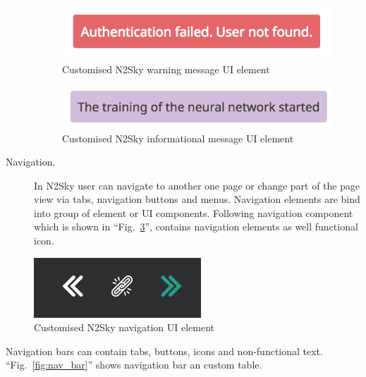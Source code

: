 \begin{description}
\begin{figure}[htbp]
\begin{center}
  \includegraphics[scale=0.65]{components/3/components/notif_warning.png}
  \caption{Customised N2Sky warning message UI element}
  \label{fig:notif_warning}
\end{center}
\end{figure}

\begin{figure}[htbp]
\begin{center}
  \includegraphics[scale=0.65]{components/3/components/notif_info.png}
  \caption{Customised N2Sky informational message UI element}
  \label{fig:notif_info}
\end{center}
\end{figure}

\item[Navigation.] In N2Sky user can navigate to another one page or change part of the page view via tabs, navigation buttons and menus. 
Navigation elements are bind into group of element or UI components. Following navigation component which is shown in ``Fig.~\ref{fig:nav}'', contains navigation elements as well functional icon. 
\end{description}

\begin{figure}[htbp]
\begin{center}
  \includegraphics[scale=0.65]{components/3/components/nav.png}
  \caption{Customised N2Sky navigation UI element}
  \label{fig:nav}
\end{center}
\end{figure}

Navigation bars can contain tabs, buttons, icons and non-functional text. ``Fig.~\ref{fig:nav_bar}'' shows navigation bar an custom table. 

